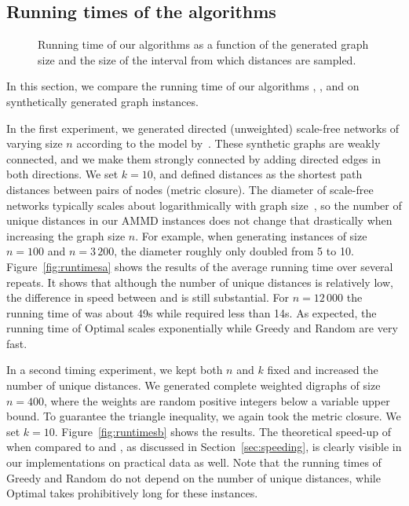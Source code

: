\subsection{Running times of the algorithms}
\label{exp:rt}
\begin{figure}[ht!]
%
\centering
{}
\hfill
{}
\caption{Running time of our algorithms as a function of the generated graph size and the size of the interval from which distances are sampled.
\label{fig:runtimes}}
\end{figure}

In this section, we compare the running time of our algorithms \algbac{}, \algbacb{}, and \algbacf{} on synthetically generated graph instances.



In the first experiment, we generated directed (unweighted) scale-free networks of varying size
$n$ according to the model by~\citet{bollobas2003directed}. These synthetic
graphs are weakly connected, and we make them strongly connected by adding
directed edges in both directions. We set $k = 10$, and defined distances as the shortest path distances between pairs of
nodes (metric closure). The diameter of scale-free networks typically scales
about logarithmically with graph size~\cite{bollobas2004diameter}, so the
number of unique distances in our AMMD instances does not change that drastically when
increasing the graph size $n$. For example, when generating instances of size
$n=100$ and $n=3\,200$, the diameter roughly only doubled from 5 to 10.
Figure~\ref{fig:runtimesa} shows the results of the average running time over
several repeats. It shows that although the number of unique distances is
relatively low, the difference in speed between \algbacb{} and \algbacf{} is
still substantial. For $n=12\,000$ the running time of \algbacb{} was about
49s while \algbacf{} required less than 14s. As expected, the running time of Optimal scales exponentially while Greedy and Random are very fast.

In a second timing experiment, we kept both $n$ and $k$ fixed and increased the number of unique distances.
We generated complete weighted digraphs of size $n=400$, where the weights are random
positive integers below a variable upper bound. To guarantee the triangle
inequality, we again took the metric closure. We set $k=10$. 
Figure~\ref{fig:runtimesb} shows the results. The theoretical speed-up of
\algbacf{} when compared to \algbac{} and \algbacb{}, as discussed in
Section~\ref{sec:speeding}, is clearly visible in our implementations on
practical data as well. Note that the running times of Greedy and Random do not depend on the number of unique distances, while Optimal takes prohibitively long for these instances. 
